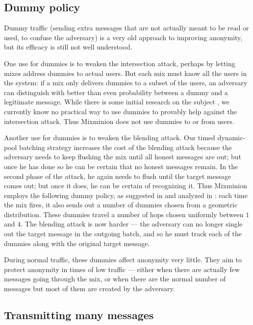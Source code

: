 \documentclass[11pt]{IEEEtran}
\begin{document}
\subsection{Dummy policy}

Dummy traffic (sending extra messages that are not actually meant to
be read or used, to confuse the adversary) is a very old approach to
improving anonymity, but its efficacy is still not well understood.

One use for dummies is to weaken the intersection attack, perhaps
by letting mixes address dummies to actual users. But each mix must
know all the users in the system: if a mix only delivers dummies to a
subset of the users, an adversary can distinguish with better than even
probability between a dummy and a legitimate message. While there is
some initial research on the subject \cite{langos02}, we currently know no
practical way to use dummies to provably help against the intersection
attack. Thus Mixminion does not use dummies to or from users.

Another use for dummies is to weaken the blending attack. Our timed
dynamic-pool batching strategy increases the cost of the blending attack
because the adversary needs to keep flushing the mix until all honest
messages are out; but once he has done so he can be certain that no
honest messages remain. In the second phase of the attack, he again
needs to flush until the target message comes out; but once it does, he
can be certain of recognizing it. Thus Mixminion employs the following
dummy policy, as suggested in \cite{batching-taxonomy} and analyzed in 
\cite{andrei-claudia}: each time the mix
fires, it also sends out a number of dummies chosen from a geometric
distribution. These dummies travel a number of hops chosen uniformly
between $1$ and $4$. The blending attack is now harder --- the adversary
can no longer single out the target message in the outgoing batch, and so
he must track each of the dummies along with the original target message.

During normal traffic, these dummies affect anonymity very little. They
aim to protect anonymity in times of low traffic --- either when
there are actually few messages going through the mix,
or when there are the normal number of messages but most of them are
created by the adversary.

\subsection{Transmitting many messages}
\label{subsec:many-messages}
\end{document}
